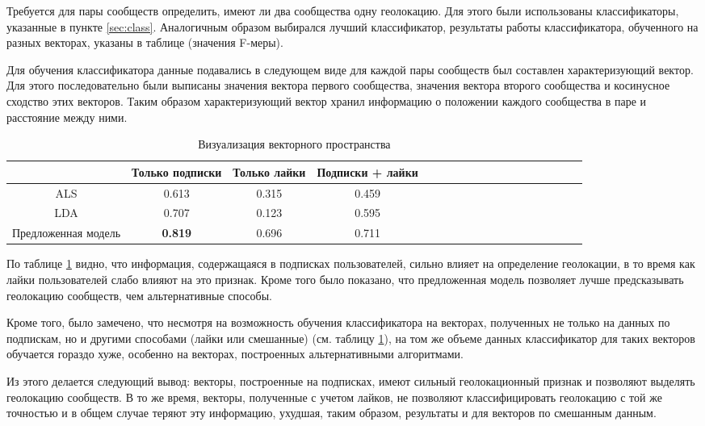 \documentclass[times,specification,annotation]{itmo-student-thesis}
\begin{document}
Требуется для пары сообществ определить, имеют ли два сообщества одну геолокацию. Для этого были использованы классификаторы, указанные в пункте \ref{sec:class}. Аналогичным образом выбирался лучший классификатор, результаты работы классификатора, обученного на разных векторах, указаны в таблице (значения F-меры). 

Для обучения классификатора данные подавались в следующем виде для каждой пары сообществ был составлен характеризующий вектор. Для этого последовательно были выписаны значения вектора первого сообщества, значения вектора второго сообщества и косинусное сходство этих векторов. Таким образом характеризующий вектор хранил информацию о положении каждого сообщества в паре и расстояние между ними.   

\begin{table}[!h]
\caption{Визуализация векторного пространства} \label{tab2-geo-cmp}
\centering
\begin{tabular}{|*{18}{c|}}\hline
  & Только подписки  & Только лайки & Подписки + лайки \\\hline
ALS                       				 & 0.613 & 0.315  & 0.459 \\\hline
LDA                       				 & 0.707 & 0.123  & 0.595 \\\hline
Предложенная модель  & \textbf{0.819} & 0.696  & 0.711 \\\hline
\end{tabular}
\end{table}

По таблице \ref {tab2-geo-cmp} видно, что информация, содержащаяся в подписках пользователей, сильно влияет на определение геолокации, в то время как лайки пользователей слабо влияют на это признак. Кроме того было показано, что предложенная модель позволяет лучше предсказывать геолокацию сообществ, чем альтернативные способы. 

Кроме того, было замечено, что несмотря на возможность обучения классификатора на векторах, полученных не только на данных по подпискам, но и другими способами (лайки или смешанные) (см. таблицу \ref{tab2-geo-cmp}), на том же объеме данных классификатор для таких векторов обучается гораздо хуже, особенно на векторах, построенных альтернативными алгоритмами. 

Из этого делается следующий вывод: векторы, построенные на подписках, имеют сильный геолокационный признак и позволяют выделять геолокацию сообществ. В то же время, векторы, полученные с учетом лайков, не позволяют классифицировать геолокацию с той же точностью и в общем случае теряют эту информацию, ухудшая, таким образом, результаты и для векторов по смешанным данным.   
\end{document}
